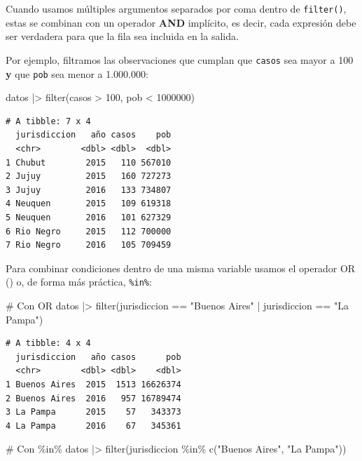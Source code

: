 \documentclass[
  spanish,
  a4paper,
]{scrbook}
\newenvironment{Shaded}{\begin{snugshade}}{\end{snugshade}}
\newcommand{\CommentTok}[1]{\textcolor[rgb]{0.37,0.37,0.37}{#1}}
\newcommand{\DecValTok}[1]{\textcolor[rgb]{0.68,0.00,0.00}{#1}}
\newcommand{\FunctionTok}[1]{\textcolor[rgb]{0.28,0.35,0.67}{#1}}
\newcommand{\NormalTok}[1]{\textcolor[rgb]{0.00,0.23,0.31}{#1}}
\newcommand{\SpecialCharTok}[1]{\textcolor[rgb]{0.37,0.37,0.37}{#1}}
\newcommand{\StringTok}[1]{\textcolor[rgb]{0.13,0.47,0.30}{#1}}
\begin{document}
Cuando usamos múltiples argumentos separados por coma dentro de
\texttt{filter()}, estas se combinan con un operador \textbf{AND}
implícito, es decir, cada expresión debe ser verdadera para que la fila
sea incluida en la salida.

Por ejemplo, filtramos las observaciones que cumplan que \texttt{casos}
sea mayor a 100 \textbf{y} que \texttt{pob} sea menor a 1.000.000:

\begin{Shaded}
\begin{Highlighting}[]
\NormalTok{datos }\SpecialCharTok{|\textgreater{}}
  \FunctionTok{filter}\NormalTok{(casos }\SpecialCharTok{\textgreater{}} \DecValTok{100}\NormalTok{, pob }\SpecialCharTok{\textless{}} \DecValTok{1000000}\NormalTok{)}
\end{Highlighting}
\end{Shaded}

\begin{verbatim}
# A tibble: 7 x 4
  jurisdiccion   año casos    pob
  <chr>        <dbl> <dbl>  <dbl>
1 Chubut        2015   110 567010
2 Jujuy         2015   160 727273
3 Jujuy         2016   133 734807
4 Neuquen       2015   109 619318
5 Neuquen       2016   101 627329
6 Rio Negro     2015   112 700000
7 Rio Negro     2016   105 709459
\end{verbatim}

Para combinar condiciones dentro de una misma variable usamos el
operador OR (\texttt{\textbar{}}) o, de forma más práctica,
\texttt{\%in\%}:

\begin{Shaded}
\begin{Highlighting}[]
\CommentTok{\# Con OR}
\NormalTok{datos }\SpecialCharTok{|\textgreater{}}
  \FunctionTok{filter}\NormalTok{(jurisdiccion }\SpecialCharTok{==} \StringTok{"Buenos Aires"} \SpecialCharTok{|}\NormalTok{ jurisdiccion }\SpecialCharTok{==} \StringTok{"La Pampa"}\NormalTok{)}
\end{Highlighting}
\end{Shaded}

\begin{verbatim}
# A tibble: 4 x 4
  jurisdiccion   año casos      pob
  <chr>        <dbl> <dbl>    <dbl>
1 Buenos Aires  2015  1513 16626374
2 Buenos Aires  2016   957 16789474
3 La Pampa      2015    57   343373
4 La Pampa      2016    67   345361
\end{verbatim}

\begin{Shaded}
\begin{Highlighting}[]
\CommentTok{\# Con \%in\%}
\NormalTok{datos }\SpecialCharTok{|\textgreater{}}
  \FunctionTok{filter}\NormalTok{(jurisdiccion }\SpecialCharTok{\%in\%} \FunctionTok{c}\NormalTok{(}\StringTok{"Buenos Aires"}\NormalTok{, }\StringTok{"La Pampa"}\NormalTok{))}
\end{Highlighting}
\end{Shaded}
\end{document}
